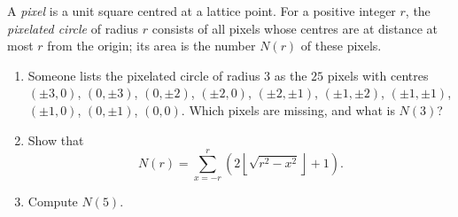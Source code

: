 A \emph{pixel} is a unit square centred at a lattice point. For a positive integer $r$, the \emph{pixelated circle} of radius $r$ consists of all pixels whose centres are at distance at most $r$ from the origin; its area is the number $N(r)$ of these pixels.
\begin{enumerate}
\item[(a)] Someone lists the pixelated circle of radius $3$ as the $25$ pixels with centres $(\pm3,0)$, $(0,\pm3)$, $(0,\pm2)$, $(\pm2,0)$, $(\pm2,\pm1)$, $(\pm1,\pm2)$, $(\pm1,\pm1)$, $(\pm1,0)$, $(0,\pm1)$, $(0,0)$. Which pixels are missing, and what is $N(3)$?
\item[(b)] Show that
\[N(r)=\sum_{x=-r}^{r}\left(2\left\lfloor\sqrt{r^2-x^2}\right\rfloor+1\right).\]
\item[(c)] Compute $N(5)$.
\end{enumerate}
